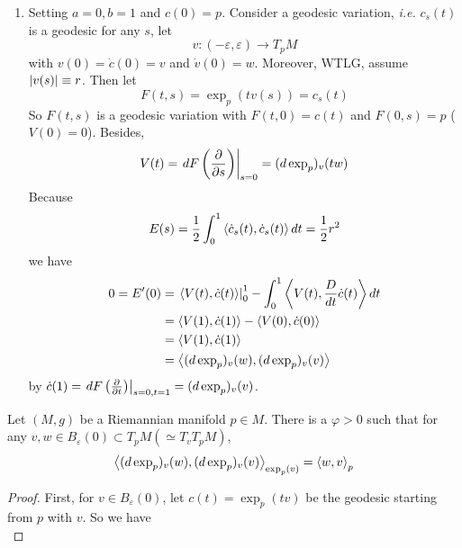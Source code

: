 \begin{enumerate}[label=\arabic{*}.]
\begin{rmk}
\begin{enumerate}[label=(\arabic{*})]
			\item Setting $a =0, b=1$ and $c(0) = p$. Consider a geodesic variation, \emph{i.e.} $c_s(t)$ is a geodesic for any $s$, let
			\begin{equation*}
				v \colon (-\varepsilon,\varepsilon) \longrightarrow T_pM
			\end{equation*}
			with $v(0) = \dot{c}(0) = v$ and $\dot{v}(0) = w$. Moreover, WTLG, assume $\left\lvert v(s)\right\lvert \equiv r$. Then let
			\begin{equation*}
				F(t,s) = \exp_p(tv(s)) = c_s(t)
			\end{equation*}
			So $F(t,s)$ is a geodesic variation with $F(t,0) = c(t)$ and $F(0,s) = p$ ($V(0) = 0$). Besides,
			\begin{equation*}
			 	V(t) = \left.dF\left(\frac{\partial}{\partial s}\right)\right\lvert_{s=0} = (d\exp_p)_v(tw)
			\end{equation*}
			Because
			\begin{equation*}
				E(s) = \frac{1}{2}\int_0^1\left\langle \dot{c}_s(t),\dot{c}_s(t) \right\rangle dt = \frac{1}{2}r^2
			\end{equation*}
			we have
			\begin{equation*}
				\begin{aligned}
					0 = E^\prime(0) &= \left.\left\langle V(t),\dot{c}(t) \right\rangle\right\lvert_{0}^{1} - \int_0^1\left\langle V(t),\frac{D}{dt}\dot{c}(t) \right\rangle dt \\
					&= \left\langle V(1),\dot{c}(1) \right\rangle- \left\langle V(0),\dot{c}(0) \right\rangle \\
					&= \left\langle V(1),\dot{c}(1) \right\rangle \\
					&= \left\langle (d\exp_p)_v(w),(d\exp_p)_v(v) \right\rangle
				\end{aligned}
			\end{equation*}
			by $\dot{c}(1) = \left.dF\left(\frac{\partial}{\partial t}\right)\right\lvert_{s=0,t=1} = (d\exp_p)_v(v)$.
		\end{enumerate}
	\end{rmk}
	\begin{lem}[Gauss]\label{lem:gausslem}
		Let $(M,g)$ be a Riemannian manifold $p \in M$. There is a $\varphi > 0$ such that for any $v,w \in B_{\varepsilon}(0) \subset T_pM (\simeq T_vT_pM)$,
		\begin{equation*}
			\left\langle (d\exp_p)_v(w),(d\exp_p)_v(v) \right\rangle_{\exp_p(v)} = \left\langle w,v \right\rangle_{p}
		\end{equation*}
	\end{lem}
	\begin{proof}
		First, for $v \in B_{\varepsilon}(0)$, let $c(t) = \exp_p(tv)$ be the geodesic starting from $p$ with $v$. So we have
		\begin{equation*}

\end{equation*}
\end{proof}
\end{enumerate}
